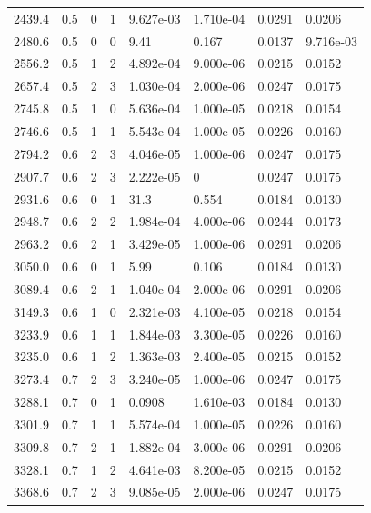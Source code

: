 \documentclass[preview]{standalone}
\begin{document}
{{{\begin{tabular}{L{1.2cm}C{1.2cm} C{0.3cm}C{0.5cm} C{1.4cm}C{1.4cm} C{1.4cm}C{1.4cm}}
  2439.4  &   0.5  & 0     &  1 &  9.627e-03  & 1.710e-04  & 0.0291 &  0.0206   \\ 
  2480.6  &   0.5  & 0     &  0 &  9.41  & 0.167  & 0.0137 &  9.716e-03   \\ 
  2556.2  &   0.5  & 1     &  2 &  4.892e-04  & 9.000e-06  & 0.0215 &  0.0152   \\ 
  2657.4  &   0.5  & 2     &  3 &  1.030e-04  & 2.000e-06  & 0.0247 &  0.0175   \\ 
  2745.8  &   0.5  & 1     &  0 &  5.636e-04  & 1.000e-05  & 0.0218 &  0.0154   \\ 
  2746.6  &   0.5  & 1     &  1 &  5.543e-04  & 1.000e-05  & 0.0226 &  0.0160   \\ 
  2794.2  &   0.6  & 2     &  3 &  4.046e-05  & 1.000e-06  & 0.0247 &  0.0175   \\ 
  2907.7  &   0.6  & 2     &  3 &  2.222e-05  & 0  & 0.0247 &  0.0175   \\ 
  2931.6  &   0.6  & 0     &  1 &  31.3  & 0.554  & 0.0184 &  0.0130   \\ 
  2948.7  &   0.6  & 2     &  2 &  1.984e-04  & 4.000e-06  & 0.0244 &  0.0173   \\ 
  2963.2  &   0.6  & 2     &  1 &  3.429e-05  & 1.000e-06  & 0.0291 &  0.0206   \\ 
  3050.0  &   0.6  & 0     &  1 &  5.99  & 0.106  & 0.0184 &  0.0130   \\ 
  3089.4  &   0.6  & 2     &  1 &  1.040e-04  & 2.000e-06  & 0.0291 &  0.0206   \\ 
  3149.3  &   0.6  & 1     &  0 &  2.321e-03  & 4.100e-05  & 0.0218 &  0.0154   \\ 
  3233.9  &   0.6  & 1     &  1 &  1.844e-03  & 3.300e-05  & 0.0226 &  0.0160   \\ 
  3235.0  &   0.6  & 1     &  2 &  1.363e-03  & 2.400e-05  & 0.0215 &  0.0152   \\ 
  3273.4  &   0.7  & 2     &  3 &  3.240e-05  & 1.000e-06  & 0.0247 &  0.0175   \\ 
  3288.1  &   0.7  & 0     &  1 &  0.0908  & 1.610e-03  & 0.0184 &  0.0130   \\ 
  3301.9  &   0.7  & 1     &  1 &  5.574e-04  & 1.000e-05  & 0.0226 &  0.0160   \\ 
  3309.8  &   0.7  & 2     &  1 &  1.882e-04  & 3.000e-06  & 0.0291 &  0.0206   \\ 
  3328.1  &   0.7  & 1     &  2 &  4.641e-03  & 8.200e-05  & 0.0215 &  0.0152   \\ 
  3368.6  &   0.7  & 2     &  3 &  9.085e-05  & 2.000e-06  & 0.0247 &  0.0175   \\ 

\end{tabular}}}}
\end{document}
